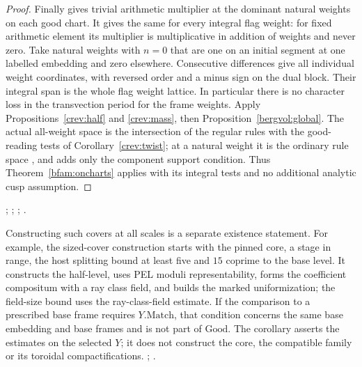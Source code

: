 \begin{proof}
Finally  gives trivial arithmetic multiplier at the
dominant natural weights on each good chart. It gives the same
for every integral flag weight: for fixed arithmetic element its
multiplier is multiplicative in addition of weights and never
zero. Take natural weights with \(n=0\) that are one on an
initial segment at one labelled embedding and zero elsewhere.
Consecutive differences give all individual weight coordinates,
with reversed order and a minus sign on the dual block. Their
integral span is the whole flag weight lattice. In particular
there is no character loss in the transvection period for the
frame weights. Apply Propositions~\ref{crev:half} and
\ref{crev:mass}, then Proposition~\ref{bergvol:global}.
The actual all-weight space  is the intersection of
the regular rules with the good-reading tests of
Corollary~\ref{crev:twist}; at a natural weight it is the ordinary
rule space , and  adds only the component
support condition. Thus Theorem~\ref{bfam:oncharts} applies with
its integral tests and no additional analytic cusp assumption.
\end{proof}
;
;
;
.

Constructing such covers at all scales is a separate existence
statement. For example, the sized-cover construction starts with
the pinned core, a stage in range, the host splitting bound at least
five and \(15\) coprime to the base level. It constructs the half-level,
uses PEL moduli representability, forms the coefficient compositum
with a ray class field, and builds the marked uniformization; the
field-size bound uses the ray-class-field estimate. If the comparison
to a prescribed base frame requires \(Y.\mathrm{Match}\), that
condition concerns the same base embedding and base frames and is
not part of \(\mathrm{Good}\). The corollary asserts the estimates
on the selected \(Y\); it does not construct the core, the compatible
family or its toroidal compactifications.
;
.
